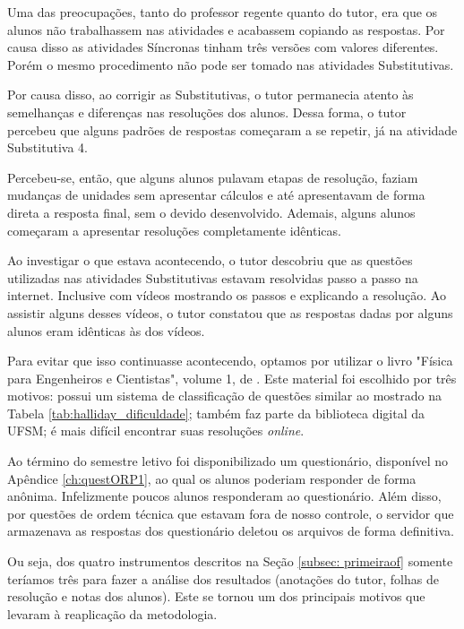 Uma das preocupações, tanto do professor regente quanto do tutor, era que os alunos não trabalhassem nas atividades e acabassem copiando as respostas. Por causa disso as atividades Síncronas tinham três versões com valores diferentes. Porém o mesmo procedimento não pode ser tomado nas atividades Substitutivas.

Por causa disso, ao corrigir as Substitutivas, o tutor permanecia atento às semelhanças e diferenças nas resoluções dos alunos. Dessa forma, o tutor percebeu que alguns padrões de respostas começaram a se repetir, já na atividade Substitutiva 4.

Percebeu-se, então, que alguns alunos pulavam etapas de resolução, faziam mudanças de unidades sem apresentar cálculos e até apresentavam de forma direta a resposta final, sem o devido desenvolvido. Ademais, alguns alunos começaram a apresentar resoluções completamente idênticas.

Ao investigar o que estava acontecendo, o tutor descobriu que as questões utilizadas nas atividades Substitutivas estavam resolvidas passo a passo na internet. Inclusive com vídeos mostrando os passos e explicando a resolução. Ao assistir alguns desses vídeos, o tutor constatou que as respostas dadas por alguns alunos eram idênticas às dos vídeos.

Para evitar que isso continuasse acontecendo, optamos por utilizar o livro "Física para Engenheiros e Cientistas", volume 1, de . Este material foi escolhido por três motivos: possui um sistema de classificação de questões similar ao mostrado na Tabela \ref{tab:halliday_dificuldade}; também faz parte da biblioteca digital da UFSM; é mais difícil encontrar suas resoluções \textit{online}.

Ao término do semestre letivo foi disponibilizado um questionário, disponível no Apêndice \ref{ch:questORP1}, ao qual os alunos poderiam responder de forma anônima. Infelizmente poucos alunos responderam ao questionário. Além disso, por questões de ordem técnica que estavam fora de nosso controle, o servidor que armazenava as respostas dos questionário deletou os arquivos de forma definitiva.

Ou seja, dos quatro instrumentos descritos na Seção \ref{subsec: primeiraof} somente teríamos três para fazer a análise dos resultados (anotações do tutor, folhas de resolução e notas dos alunos). Este se tornou um dos principais motivos que levaram à reaplicação da metodologia.

